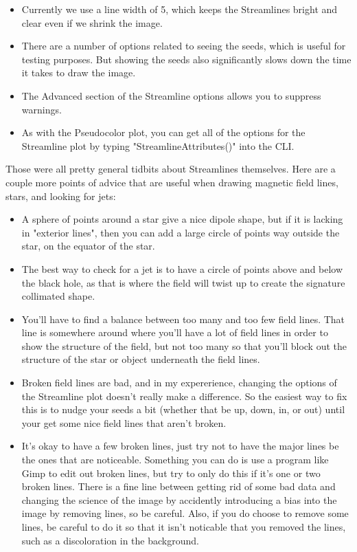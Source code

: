 \documentclass[english]{article}
\begin{document}
\begin{itemize}
        \item Currently we use a line width of 5, which keeps the Streamlines bright and clear even if we shrink 
              the image.
        \item There are a number of options related to seeing the seeds, which is useful for testing purposes. But 
              showing the seeds also significantly slows down the time it takes to draw the image.
        \item The Advanced section of the Streamline options allows you to suppress warnings.
        \item As with the Pseudocolor plot, you can get all of the options for the Streamline plot by typing 
              "StreamlineAttributes()" into the CLI.
    \end{itemize} 

    Those were all pretty general tidbits about Streamlines themselves. Here are a couple more points of advice that
    are useful when drawing magnetic field lines, stars, and looking for jets:
    \begin{itemize}
        \item A sphere of points around a star give a nice dipole shape, but if it is lacking in "exterior lines", 
              then you can add a large circle of points way outside the star, on the equator of the star.
        \item The best way to check for a jet is to have a circle of points above and below the black hole, as that 
              is where the field will twist up to create the signature collimated shape.
        \item You'll have to find a balance between too many and too few field lines. That line is somewhere around
              where you'll have a lot of field lines in order to show the structure of the field, but not too many 
              so that you'll block out the structure of the star or object underneath the field lines.
        \item Broken field lines are bad, and in my expererience, changing the options of the Streamline plot doesn't
              really make a difference. So the easiest way to fix this is to nudge your seeds a bit (whether that be
              up, down, in, or out) until your get some nice field lines that aren't broken. 
        \item It's okay to have a few broken lines, just try not to have the major lines be the ones that are noticeable.
              Something you can do is use a program like Gimp to edit out broken lines, but try to only do this if it's
              one or two broken lines. There is a fine line between getting rid of some bad data and changing the science
              of the image by accidently introducing a bias into the image by removing lines, so be careful. Also, if 
              you do choose to remove some lines, be careful to do it so that it isn't noticable that you removed the 
              lines, such as a discoloration in the background.
    \end{itemize}
\end{document}
